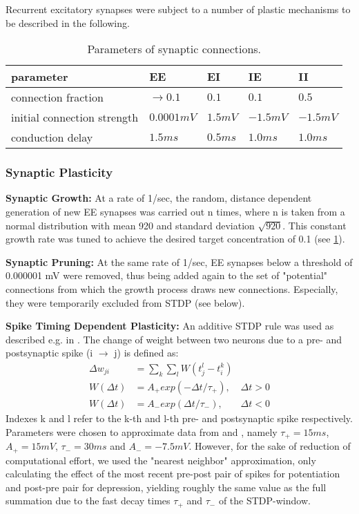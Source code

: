 \documentclass[10pt,a4paper]{article}
\begin{document}
Recurrent excitatory synapses were subject to a number of plastic mechanisms to be described in the following. 

\begin{table}
\begin{tabular}{|l|l|l|l|l|}
\hline
\textbf{parameter} & \textbf{EE} & \textbf{EI} & \textbf{IE} & \textbf{II} \\ \hline
connection fraction & $\rightarrow 0.1$ & $0.1$ & $0.1$ & $0.5$ \\ \hline
initial connection strength & $0.0001 mV$ & $1.5 mV$ & $-1.5 mV$ & $-1.5 mV$ \\ \hline
conduction delay & $1.5 ms$ & $0.5 ms$ & $1.0 ms$ & $1.0 ms$ \\
\hline
\end{tabular}
\caption{Parameters of synaptic connections.}
\label{syn_conn_params}
\end{table}

\subsubsection{Synaptic Plasticity}

\textbf{Synaptic Growth:} At a rate of 1/sec, the random, distance dependent generation of new EE synapses was carried out n times, where n is taken from a normal distribution with mean 920 and standard deviation $\sqrt{920}$. This constant growth rate was tuned to achieve the desired target concentration of 0.1 (see \ref{syn_conn_params}).

\textbf{Synaptic Pruning:} At the same rate of 1/sec, EE synapses below a threshold of 0.000001 mV were removed, thus being added again to the set of "potential" connections from which the growth process draws new connections. Especially, they were temporarily excluded from STDP (see below).

\textbf{Spike Timing Dependent Plasticity:} An additive STDP rule was used as described e.g. in \cite{Zhang_STDP}. The change of weight between two neurons due to a pre- and postsynaptic spike (i $\rightarrow$ j) is defined as:
\begin{align}
\Delta w_{ji} &= \sum_k \sum_l W(t_j^l - t_i^k) \label{STDP_rule} \\
W(\Delta t) &= A_{+} exp(-\Delta t / \tau_{+}), & \Delta t > 0 \label{STDP_pos} \\
W(\Delta t) &= A_{-} exp(\Delta t / \tau_{-}), & \Delta t < 0 \label{STDP_neg}
\end{align}
Indexes k and l refer to the k-th and l-th pre- and postsynaptic spike respectively. Parameters were chosen to approximate data from \cite{Bi_Poo_STDP} and \cite{Froemke_STDP}, namely $\tau_{+} = 15 ms$, $A_{+} = 15 mV$, $\tau_{-} = 30 ms$ and $A_{-} = -7.5 mV$. However, for the sake of reduction of computational effort, we used the "nearest neighbor" approximation, only calculating the effect of the most recent pre-post pair of spikes for potentiation and post-pre pair for depression, yielding roughly the same value as the full summation due to the fast decay times $\tau_{+}$ and $\tau_{-}$ of the STDP-window.
\end{document}
